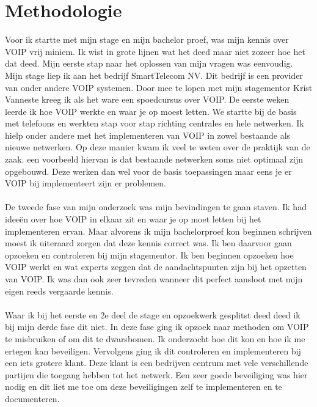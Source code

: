 \documentclass[pdftex,a4paper,12pt,twoside]{report}
\begin{document}

\chapter{Methodologie}
\label{ch:methodologie}

Voor ik startte met mijn stage en mijn bachelor proef, was mijn kennis over VOIP vrij miniem. Ik wist in grote lijnen wat het deed maar niet zozeer hoe het dat deed. Mijn eerste stap naar het oplossen van mijn vragen was eenvoudig. Mijn stage liep ik aan het bedrijf SmartTelecom NV. Dit bedrijf is een provider van onder andere VOIP systemen. Door mee te lopen met mijn stagementor Krist Vanneste kreeg ik als het ware een spoedcursus over VOIP. De eerste weken leerde ik hoe VOIP werkte en waar je op moest letten. We startte bij de basis met telefoons en werkten stap voor stap richting centrales en hele netwerken. Ik hielp onder andere met het implementeren van VOIP in zowel bestaande als nieuwe netwerken. Op deze manier kwam ik veel te weten over de praktijk van de zaak. een voorbeeld hiervan is dat bestaande netwerken soms niet optimaal zijn opgebouwd. Deze werken dan wel voor de basis toepassingen maar eens je er VOIP bij implementeert zijn er problemen. 
\\ \\
De tweede fase van mijn onderzoek was mijn bevindingen te gaan staven. Ik had ideeën over hoe VOIP in elkaar zit en waar je op moet letten bij het implementeren ervan. Maar alvorens ik mijn bachelorproef kon beginnen schrijven moest ik uiteraard zorgen dat deze kennis correct was. Ik ben daarvoor gaan opzoeken en controleren bij mijn stagementor. Ik ben beginnen opzoeken hoe VOIP werkt en wat experts zeggen dat de aandachtspunten zijn bij het opzetten van VOIP. Ik was dan ook zeer tevreden wanneer dit perfect aansloot met mijn eigen reeds vergaarde kennis.
\\ \\
Waar ik bij het eerste en 2e deel de stage en opzoekwerk gesplitst deed deed ik bij mijn derde fase dit niet. In deze fase ging ik opzoek naar methoden om VOIP te misbruiken of om dit te dwarsbomen. Ik onderzocht hoe dit kon en hoe ik me ertegen kan beveiligen. Vervolgens ging ik dit controleren en implementeren bij een iets grotere klant. Deze klant is een bedrijven centrum met vele verschillende partijen die toegang hebben tot het netwerk. Een zeer goede beveiliging was hier nodig en dit liet me toe om deze beveiligingen zelf te implementeren en te documenteren.
\newpage
\end{document}
